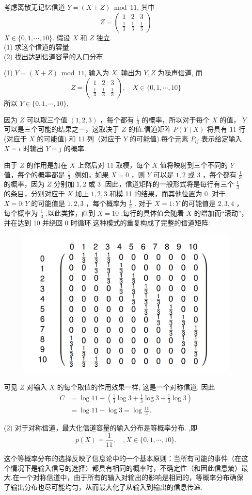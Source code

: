 \begin{exercise}
考虑离散无记忆信道 $ Y=(X+Z) \bmod 11 $, 其中
$$
Z=\left(\begin{array}{ccc}
1 & 2 & 3 \\
\frac1 3 & \frac1 3 & \frac1 3
\end{array}\right)
$$
$ X \in\{0,1, \cdots, 10\} $. 假设 $ X $ 和 $ Z $ 独立.\\
(1) 求这个信道的容量.\\
(2) 找出达到信道容量的入口分布.
\end{exercise}
\begin{solution}
(1) $ Y=(X+Z) \bmod 11 $, 输入为 $ X $, 输出为 $ Y, Z $ 为噪声信道, 而
$$
Z=\left(\begin{array}{ccc}
1 & 2 & 3 \\
\frac1 3 & \frac1 3 & \frac1  3
\end{array}\right), \quad X \in\{0,1, \cdots, 10\}
$$
所以 $ Y \in\{0,1, \cdots, 10\} $, 

因为 $ Z $ 可以取三个值 $ (1,2,3) $ ，每个都有 $ \frac{1}{3} $ 的概率，所以对于每个 $ X $ 的值， $ Y $ 可以是三个可能的结果之一，这取决于 $ Z $ 的值.信道矩阵 $ P(Y \mid X) $ 将具有 11 行 (对应于 $ X $ 的可能值) 和 11 列（对应于 $ Y $ 的可能值).每个元素 $ P_{i j} $ 表示给定输入 $ X=i $ 时输出 $ Y=j $ 的概率.

由于 $ Z $ 的作用是加在 $ X $ 上然后对 11 取模，每个 $ X $ 值将映射到三个不同的 $ Y $ 值，每个的概率都是 $ \frac{1}{3} $ .例如，如果 $ X=0 $ ，则 $ Y $ 可以是 $ 1 , 2 $ 或 3 ，每个都有 $ \frac{1}{3} $ 的概率，因为 $ Z $ 分别加 $ 1 , 2 $ 或 3 .因此，信道矩阵的一般形式将是每行有三个 $ \frac{1}{3} $ 的条目，分别对应于 $ X $ 加上 $ 1 , 2 , 3 $ 和模 11 的结果，而其他位置为 0 .对于 $ X=0: Y $ 的可能值是 $ 1,2,3 $ ，每个概率为 $ \frac{1}{3} $ . 对于 $ X=1: Y $ 的可能值是 $ 2,3,4 $ ，每个概率为 $ \frac{1}{3} $ .以此类推，直到 $ X=10 $ .每行的具体值会随着 $ X $ 的增加而“滚动”，并在达到 10 并绕回 0 时循环.这种模式的重复构成了完整的信道矩阵:

\begin{figure}[h]
    \centering
    \includegraphics[width=0.6\linewidth]{image/12.png}
\end{figure}
可见 $ Z $ 对输入 $ X $ 的每个取值的作用效果一样, 这是一个对称信道, 因此
$$
\begin{aligned}
C & =\log 11-\left(\frac{1}{3} \log 3+\frac{1}{3} \log 3+\frac{1}{3} \log 3\right) \\
& =\log 11-\log 3=\log \frac{11}{3} .
\end{aligned}
$$

(2) 对于对称信道，最大化信道容量的输入分布是等概率分布. ,即
$$
p(X)=\frac{1}{11}, \quad, X \in\{0,1, \cdots, 10\} .
$$
\end{solution}

这个等概率分布的选择反映了信息论中的一个基本原则：当所有可能的事件（在这个情况下是输入信号的选择）都具有相同的概率时，不确定性（和因此信息熵）最大.在一个对称信道中，由于所有的输入对输出的影响是相同的，等概率分布确保了输出分布也尽可能均匀，从而最大化了从输入到输出的信息传递.

